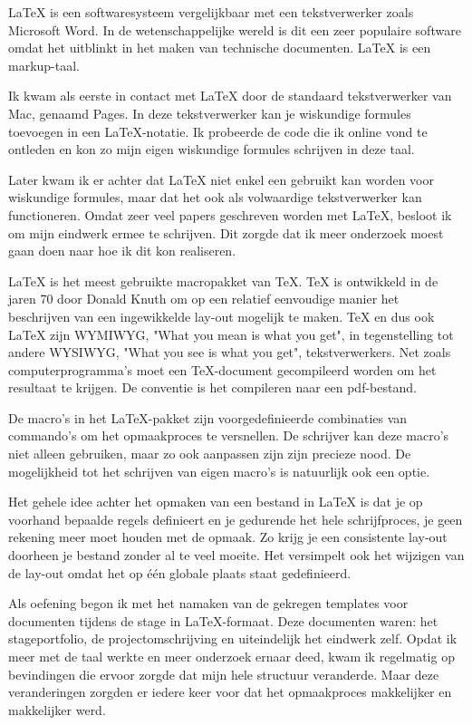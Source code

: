 \LaTeX{} is een softwaresysteem vergelijkbaar met een tekstverwerker zoals Microsoft Word. In de wetenschappelijke wereld is dit een zeer populaire software omdat het uitblinkt in het maken van technische documenten. \LaTeX{} is een markup\hyp{}taal.

Ik kwam als eerste in contact met \LaTeX{} door de standaard tekstverwerker van Mac, genaamd Pages. In deze tekstverwerker kan je wiskundige formules toevoegen in een \LaTeX{}\hyp{}notatie. Ik probeerde de code die ik online vond te ontleden en kon zo mijn eigen wiskundige formules schrijven in deze taal.

Later kwam ik er achter dat \LaTeX{} niet enkel een gebruikt kan worden voor wiskundige formules, maar dat het ook als volwaardige tekstverwerker kan functioneren. Omdat zeer veel papers geschreven worden met \LaTeX{}, besloot ik om mijn eindwerk ermee te schrijven. Dit zorgde dat ik meer onderzoek moest gaan doen naar hoe ik dit kon realiseren.

\LaTeX{} is het meest gebruikte macropakket van \TeX{}. \TeX{} is ontwikkeld in de jaren 70 door Donald Knuth om op een relatief eenvoudige manier het beschrijven van een ingewikkelde lay\hyp{}out mogelijk te maken. \TeX{} en dus ook \LaTeX{} zijn WYMIWYG, "What you mean is what you get", in tegenstelling tot andere WYSIWYG, "What you see is what you get", tekstverwerkers. Net zoals computerprogramma's moet een \TeX{}\hyp{}document gecompileerd worden om het resultaat te krijgen. De conventie is het compileren naar een pdf\hyp{}bestand.

De macro's in het \LaTeX{}\hyp{}pakket zijn voorgedefinieerde combinaties van commando's om het opmaakproces te versnellen. De schrijver kan deze macro's niet alleen gebruiken, maar zo ook aanpassen zijn zijn precieze nood. De mogelijkheid tot het schrijven van eigen macro's is natuurlijk ook een optie.

Het gehele idee achter het opmaken van een bestand in \LaTeX{} is dat je op voorhand bepaalde regels definieert en je gedurende het hele schrijfproces, je geen rekening meer moet houden met de opmaak. Zo krijg je een consistente lay\hyp{}out doorheen je bestand zonder al te veel moeite. Het versimpelt ook het wijzigen van de lay\hyp{}out omdat het op één globale plaats staat gedefinieerd.

Als oefening begon ik met het namaken van de gekregen templates voor documenten tijdens de stage in \LaTeX{}\hyp{}formaat. Deze documenten waren: het stageportfolio, de projectomschrijving en uiteindelijk het eindwerk zelf. Opdat ik meer met de taal werkte en meer onderzoek ernaar deed, kwam ik regelmatig op bevindingen die ervoor zorgde dat mijn hele structuur veranderde. Maar deze veranderingen zorgden er iedere keer voor dat het opmaakproces makkelijker en makkelijker werd.

